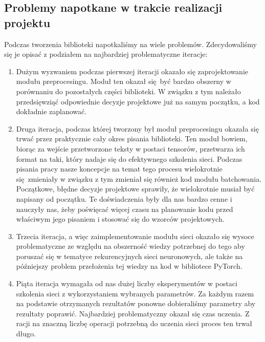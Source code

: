 \subsection{Problemy napotkane w trakcie realizacji projektu}
Podczas tworzenia biblioteki napotkaliśmy na wiele problemów. Zdecydowaliśmy się je opisać z podziałem na 
najbardziej problematyczne iteracje:

\begin{enumerate}
  \item Dużym wyzwaniem podczas pierwszej iteracji okazało
  się zaprojektowanie modułu preprocesingu. Moduł ten okazał się być bardzo obszerny w porównaniu do
  pozostałych części biblioteki. W związku z tym należało przedsięwziąć odpowiednie decyzje projektowe 
  już na samym początku, a kod dokładnie zaplanować.
  
  \item Druga iteracja, podczas której tworzony był moduł preprocesingu okazała się trwać przez praktycznie
  cały okres pisania biblioteki. Ten moduł bowiem, biorąc za wejście przetworzone teksty w postaci tensorów,
  przetwarza ich format na taki, który nadaje się do efektywnego szkolenia sieci. Podczas pisania pracy 
  nasze koncepcje na temat tego procesu wielokrotnie się zmieniały w związku z tym zmieniał się również
  kod modułu batchowania. Początkowe, błędne decyzje projektowe sprawiły, że wielokrotnie musiał być 
  napisany od początku. Te doświadczenia były dla nas bardzo cenne i nauczyły nas, żeby poświęcać
  więcej czasu na planowanie kodu przed właściwym jego pisaniem i stosować się do wzorców projektowych.

  \item Trzecia iteracja, a więc zaimplementowanie modułu sieci okazało się wysoce problematyczne ze względu na obszerność 
  wiedzy potrzebnej do tego aby poruszać się w tematyce rekurencyjnych sieci neuronowych, ale także
  na późniejszy problem przełożenia tej wiedzy na kod w bibliotece PyTorch.
  
  \item Piąta iteracja wymagała od nas dużej liczby eksperymentów w postaci szkolenia sieci z wykorzystaniem wybranych
  parametrów. Za każdym razem na podstawie otrzymanych rezultatów ponowne dobieraliśmy parametry aby rezultaty poprawić.
  Najbardziej problematyczny okazał się czas uczenia. Z racji na znaczną liczbę operacji potrzebną do 
  uczenia sieci proces ten trwał długo.
\end{enumerate}
